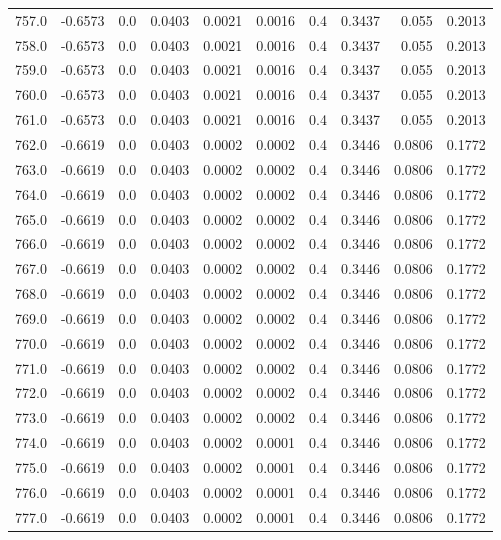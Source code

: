 \begin{longtable}{lrrrrrrrrr}
757.0 & -0.6573 & 0.0 & 0.0403 & 0.0021 & 0.0016 & 0.4 & 0.3437 & 0.055 & 0.2013 \\
758.0 & -0.6573 & 0.0 & 0.0403 & 0.0021 & 0.0016 & 0.4 & 0.3437 & 0.055 & 0.2013 \\
759.0 & -0.6573 & 0.0 & 0.0403 & 0.0021 & 0.0016 & 0.4 & 0.3437 & 0.055 & 0.2013 \\
760.0 & -0.6573 & 0.0 & 0.0403 & 0.0021 & 0.0016 & 0.4 & 0.3437 & 0.055 & 0.2013 \\
761.0 & -0.6573 & 0.0 & 0.0403 & 0.0021 & 0.0016 & 0.4 & 0.3437 & 0.055 & 0.2013 \\
762.0 & -0.6619 & 0.0 & 0.0403 & 0.0002 & 0.0002 & 0.4 & 0.3446 & 0.0806 & 0.1772 \\
763.0 & -0.6619 & 0.0 & 0.0403 & 0.0002 & 0.0002 & 0.4 & 0.3446 & 0.0806 & 0.1772 \\
764.0 & -0.6619 & 0.0 & 0.0403 & 0.0002 & 0.0002 & 0.4 & 0.3446 & 0.0806 & 0.1772 \\
765.0 & -0.6619 & 0.0 & 0.0403 & 0.0002 & 0.0002 & 0.4 & 0.3446 & 0.0806 & 0.1772 \\
766.0 & -0.6619 & 0.0 & 0.0403 & 0.0002 & 0.0002 & 0.4 & 0.3446 & 0.0806 & 0.1772 \\
767.0 & -0.6619 & 0.0 & 0.0403 & 0.0002 & 0.0002 & 0.4 & 0.3446 & 0.0806 & 0.1772 \\
768.0 & -0.6619 & 0.0 & 0.0403 & 0.0002 & 0.0002 & 0.4 & 0.3446 & 0.0806 & 0.1772 \\
769.0 & -0.6619 & 0.0 & 0.0403 & 0.0002 & 0.0002 & 0.4 & 0.3446 & 0.0806 & 0.1772 \\
770.0 & -0.6619 & 0.0 & 0.0403 & 0.0002 & 0.0002 & 0.4 & 0.3446 & 0.0806 & 0.1772 \\
771.0 & -0.6619 & 0.0 & 0.0403 & 0.0002 & 0.0002 & 0.4 & 0.3446 & 0.0806 & 0.1772 \\
772.0 & -0.6619 & 0.0 & 0.0403 & 0.0002 & 0.0002 & 0.4 & 0.3446 & 0.0806 & 0.1772 \\
773.0 & -0.6619 & 0.0 & 0.0403 & 0.0002 & 0.0002 & 0.4 & 0.3446 & 0.0806 & 0.1772 \\
774.0 & -0.6619 & 0.0 & 0.0403 & 0.0002 & 0.0001 & 0.4 & 0.3446 & 0.0806 & 0.1772 \\
775.0 & -0.6619 & 0.0 & 0.0403 & 0.0002 & 0.0001 & 0.4 & 0.3446 & 0.0806 & 0.1772 \\
776.0 & -0.6619 & 0.0 & 0.0403 & 0.0002 & 0.0001 & 0.4 & 0.3446 & 0.0806 & 0.1772 \\
777.0 & -0.6619 & 0.0 & 0.0403 & 0.0002 & 0.0001 & 0.4 & 0.3446 & 0.0806 & 0.1772 \\

\end{longtable}
